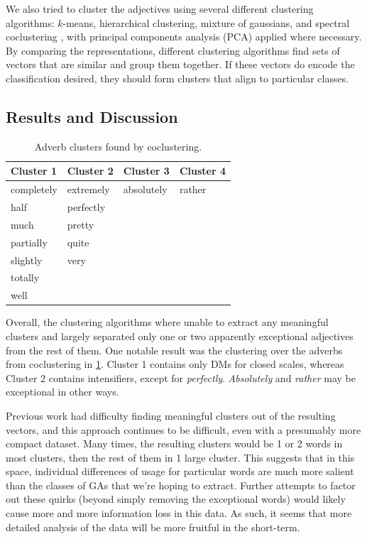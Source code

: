 \documentclass[11pt]{article}
\begin{document}
We also tried to cluster the adjectives using several different clustering algorithms: $k$-means, hierarchical clustering, mixture of gaussians, and spectral coclustering \cite{coclustering}, with principal components analysis (PCA) applied where necessary. By comparing the representations, different clustering algorithms find sets of vectors that are similar and group them together. If these vectors do encode the classification desired, they should form clusters that align to particular classes.

\subsection{Results and Discussion}

\begin{table}[h]
\begin{center}
\begin{tabular}{|l|l|l|l|}
\hline \bf Cluster 1& \bf Cluster 2 & \bf Cluster 3 & \bf Cluster 4 \\ \hline
completely & extremely & absolutely & rather \\ 
half & perfectly & & \\ 
much & pretty & &  \\ 
partially & quite & &  \\ 
slightly & very & & \\ 
totally & & & \\ 
well & & & \\ \hline
\end{tabular}
\end{center}
\caption{\label{tab:adv-clusters} Adverb clusters found by coclustering. }
\end{table}

Overall, the clustering algorithms where unable to extract any meaningful clusters and largely separated only one or two apparently exceptional adjectives from the rest of them. One notable result was the clustering over the adverbs from coclustering in \ref{tab:adv-clusters}. Cluster 1 contains only DMs for closed scales, whereas Cluster 2 contains intensifiers, except for \textit{perfectly}. \textit{Absolutely} and \textit{rather} may be exceptional in other ways.

Previous work had difficulty finding meaningful clusters out of the resulting vectors, and this approach continues to be difficult, even with a presumably more compact dataset. Many times, the resulting clusters would be 1 or 2 words in most clusters, then the rest of them in 1 large cluster. This suggests that in this space, individual differences of usage for particular words are much more salient than the classes of GAs that we're hoping to extract. Further attempts to factor out these quirks (beyond simply removing the exceptional words) would likely cause more and more information loss in this data. As such, it seems that more detailed analysis of the data will be more fruitful in the short-term.
\end{document}

